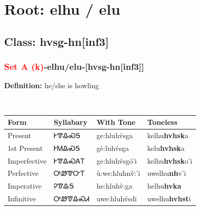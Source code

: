 \needspace{4in}
\section*{Root: elhu / elu}
\nopagebreak
{}
\needspace{3in}
\subsection*{Class: hvsg-hn[inf3]}
\nopagebreak
\needspace{2in}
\subsubsection*{\textcolor{Red}{Set A (k)}{-}\textbf{elhu/elu}{-}[hvsg-hn[inf3]]}
\nopagebreak
\textbf{Definition: } he/she is howling
\\[0.5em]
\begin{tabularx}{\textwidth}{l X X X}%
\toprule%
\textbf{Form}&\textbf{Syllabary}&\textbf{With Tone}&\textbf{Toneless}\\%
\midrule%
Present&ᎨᏡᎲᏍᎦ&ge:hluhv́sga&kelhu\textbf{hvhsk}a\\%
1st Present&ᎨᎷᎲᏍᎦ&gè:luhv́sga&kelu\textbf{hvhsk}a\\%
Imperfective&ᎨᏡᎲᏍᎪᎢ&ge:hluhv́sgó’i&kelhu\textbf{hvhsk}o'i\\%
Perfective&ᎤᏪᏡᏅᎢ&ù:we:hluhnv̌:’i&uwelhu\textbf{nh}v'i\\%
Imperative&ᎮᏡᎲᎦ&he:hluhv̀:ga&helhu\textbf{hvka}\\%
Infinitive&ᎤᏪᏡᎲᏍᏗ&uwe:hluhv́sdi&uwelhu\textbf{hvhst}i\\%
\bottomrule%
\end{tabularx}
\\[1em]